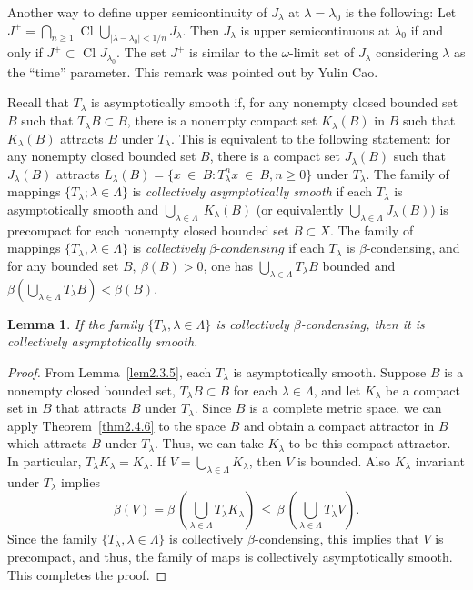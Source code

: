 \documentclass{surv-l}
\theoremstyle{plain}
\newtheorem{lemma}[theorem]{Lemma}
\theoremstyle{definition}
\numberwithin{equation}{section}
\numberwithin{figure}{chapter}
\begin{document}
Another way to define upper semicontinuity of $J_{\lambda}$ at $\lambda=\lambda_{0}$ is the following: Let $J^{+}=\bigcap_{n\geq 1}$ Cl $\bigcup_{|\lambda-\lambda_{0}|<1/n}J_{\lambda}$. Then $J_{\lambda}$ is upper semicontinuous at $\lambda_{0}$ if and only if $J^{+}\subset$ Cl $J_{\lambda_{0}}$. The set $J^{+}$ is similar to the $\omega$-limit set of $J_{\lambda}$ considering $\lambda$ as the ``time'' parameter. This remark was pointed out by Yulin Cao.

Recall that $T_{\lambda}$ is asymptotically smooth if, for any nonempty closed bounded set $B$ such that $T_{\lambda}B\subset B$, there is a nonempty compact set $K_{\lambda}(B)$ in $B$ such that $K_{\lambda}(B)$ attracts $B$ under $T_{\lambda}$. This is equivalent to the following statement: for any nonempty closed bounded set $B$, there is a compact set $J_{\lambda}(B)$ such that $J_{\lambda}(B)$ attracts $L_{\lambda}(B)=\{x\ \in\ B\!:T_{\lambda}^{n}x\ \in\ B, n\geq 0\}$ under $T_{\lambda}$. The family of mappings $\{T_{\lambda};\lambda \in\Lambda\}$ is \emph{collectively asymptotically smooth} if each $T_{\lambda}$ is asymptotically smooth and $\bigcup_{\lambda\in\Lambda}\ K_{\lambda}(B)$ (or equivalently $\bigcup_{\lambda\in\Lambda}J_{\lambda}(B)$) is precompact for each nonempty closed bounded set $B\subset X$. The family of mappings $\{T_{\lambda}, \lambda \in\Lambda\}$ is \emph{collectively} $\beta$-$condensing$ if each $T_{\lambda}$ is $\beta$-condensing, and for any bounded set $B,\ \beta(B)>0$, one has $\bigcup_{\lambda\in\Lambda}T_{\lambda}B$ bounded and $\beta(\bigcup_{\lambda\in\Lambda}T_{\lambda}B)<\beta(B)$.

\begin{lemma}\label{lem2.5.1} If the family $\{T_{\lambda}, \lambda \in\Lambda\}$ is collectively $\beta$-condensing, then it is collectively asymptotically smooth.
\end{lemma}

\begin{proof} From Lemma~\ref{lem2.3.5}, each $T_{\lambda}$ is asymptotically smooth. Suppose $B$ is a nonempty closed bounded set, $T_{\lambda}B\subset B$ for each $\lambda\in\Lambda$, and let $K_{\lambda}$ be a compact set in $B$ that attracts $B$ under $T_{\lambda}$. Since $B$ is a complete metric space, we can apply Theorem~\ref{thm2.4.6} to the space $B$ and obtain a compact attractor in $B$ which attracts $B$ under $T_{\lambda}$. Thus, we can take $K_{\lambda}$ to be this compact attractor. In particular, $T_{\lambda}K_{\lambda}=K_{\lambda}$. If $V=\bigcup_{\lambda\in\Lambda}K_{\lambda}$, then $V$ is bounded. Also $K_{\lambda}$ invariant under $T_{\lambda}$ implies
\begin{equation*}
\beta(V)=\beta\,\left(\bigcup_{\lambda\in\Lambda}T_{\lambda}K_{\lambda}\right)\,\leq\,\beta\,
\left(\bigcup_{\lambda\in\Lambda}T_{\lambda}V\right).
\end{equation*}
Since the family $\{T_{\lambda}, \lambda\in\Lambda\}$ is collectively $\beta$-condensing, this implies that $V$ is precompact, and thus, the family of maps is collectively asymptotically smooth. This completes the proof.
\end{proof}
\end{document}
